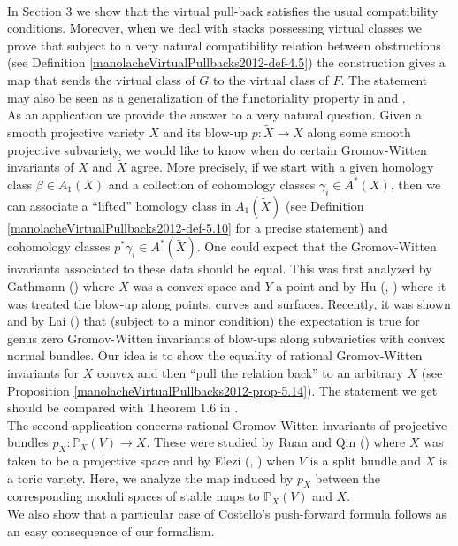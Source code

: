 \\In Section 3 we show that the virtual pull-back satisfies the usual compatibility conditions. Moreover, when we deal with stacks possessing virtual classes we prove that subject to a very natural compatibility relation between obstructions (see Definition \ref{manolacheVirtualPullbacks2012-def-4.5}) the construction gives a map that sends the virtual class of $G$ to the virtual class of $F$. The statement may also be seen as a generalization of the functoriality property in \cite{bf} and \cite{K:01}.
\\As an application we provide the answer to a very natural question. Given a smooth projective variety $X$ and its blow-up $p:\tilde{X}\to X$ along some smooth projective subvariety, we would like to know when do certain Gromov-Witten invariants of $X$ and $\tilde{X}$ agree. More precisely, if we start with a given homology class $\beta\in A_1(X)$ and a collection of cohomology classes $\gamma_i\in A^*(X)$, then we can associate a ``lifted'' homology class in $A_1(\tilde{X})$ (see Definition \ref{manolacheVirtualPullbacks2012-def-5.10} for a precise statement) and cohomology classes $p^*\gamma_i\in A^*(\tilde{X})$. One could expect that the Gromov-Witten invariants associated to these data should be equal. This was first analyzed by Gathmann (\cite{G:01}) where $X$ was a convex space and $Y$ a point and by Hu (\cite{H:00}, \cite{H:02}) where it was treated the blow-up along points, curves and surfaces. Recently, it was shown and by Lai (\cite{h}) that (subject to a minor condition) the expectation is true  for genus zero Gromov-Witten invariants of blow-ups along subvarieties with convex normal bundles. Our idea is to show the equality of rational Gromov-Witten invariants for $X$ convex and then ``pull the relation back'' to an arbitrary $X$ (see Proposition \ref{manolacheVirtualPullbacks2012-prop-5.14}). The statement we get should be compared with Theorem 1.6 in \cite{h}.
\\The second application concerns rational Gromov-Witten invariants of projective bundles $p_X:\mathbb{P}_X(V)\to X$. These were studied by Ruan and Qin (\cite{ru}) where $X$ was taken to be a projective space and by Elezi (\cite{e1}, \cite{e2}) when $V$ is a split bundle and $X$ is a toric variety. Here, we analyze the map induced by $p_X$ between the corresponding moduli spaces of stable maps to $\mathbb{P}_X(V)$ and $X$.
\\We also show that a particular case of Costello's push-forward formula follows as an easy consequence of our formalism.
